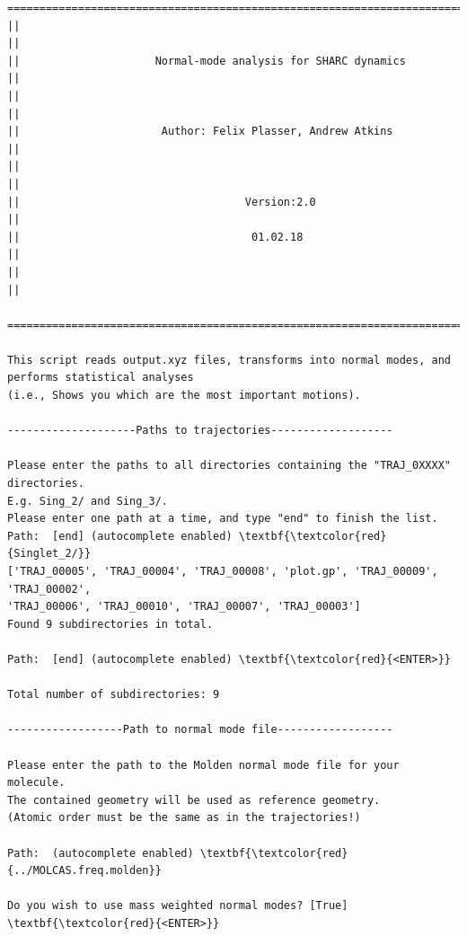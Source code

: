 \documentclass[a4paper,11pt,DIV=15,openany]{scrbook}
\begin{document}
\begin{oframed}
\footnotesize\begin{Verbatim}[commandchars=\\\{\}]
  ================================================================================
||                                                                                ||
||                     Normal-mode analysis for SHARC dynamics                    ||
||                                                                                ||
||                      Author: Felix Plasser, Andrew Atkins                      ||
||                                                                                ||
||                                   Version:2.0                                  ||
||                                    01.02.18                                    ||
||                                                                                ||
  ================================================================================

This script reads output.xyz files, transforms into normal modes, and performs statistical analyses 
(i.e., Shows you which are the most important motions).
  
--------------------Paths to trajectories-------------------

Please enter the paths to all directories containing the "TRAJ_0XXXX" directories.
E.g. Sing_2/ and Sing_3/. 
Please enter one path at a time, and type "end" to finish the list.
Path:  [end] (autocomplete enabled) \textbf{\textcolor{red}{Singlet_2/}}
['TRAJ_00005', 'TRAJ_00004', 'TRAJ_00008', 'plot.gp', 'TRAJ_00009', 'TRAJ_00002', 
'TRAJ_00006', 'TRAJ_00010', 'TRAJ_00007', 'TRAJ_00003']
Found 9 subdirectories in total.

Path:  [end] (autocomplete enabled) \textbf{\textcolor{red}{<ENTER>}}

Total number of subdirectories: 9

------------------Path to normal mode file------------------

Please enter the path to the Molden normal mode file for your molecule. 
The contained geometry will be used as reference geometry.
(Atomic order must be the same as in the trajectories!)

Path:  (autocomplete enabled) \textbf{\textcolor{red}{../MOLCAS.freq.molden}}

Do you wish to use mass weighted normal modes? [True] \textbf{\textcolor{red}{<ENTER>}}


\end{Verbatim}
\end{oframed}
\end{document}

